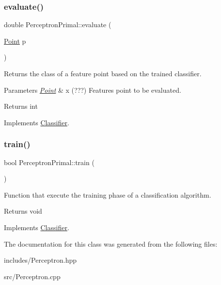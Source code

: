 \subsubsection{\texorpdfstring{evaluate()}{evaluate()}}
{\footnotesize\ttfamily double Perceptron\+Primal\+::evaluate (\begin{DoxyParamCaption}\item[{\hyperlink{class_point}{Point}}]{p }\end{DoxyParamCaption})\hspace{0.3cm}{\ttfamily [virtual]}}



Returns the class of a feature point based on the trained classifier. 


\begin{DoxyParams}{Parameters}
{\em \hyperlink{class_point}{Point}} & x (???) Features point to be evaluated. \\
\hline
\end{DoxyParams}
\begin{DoxyReturn}{Returns}
int 
\end{DoxyReturn}


Implements \hyperlink{class_classifier_ae8e9554823b85ddc2dcad2955da811d9}{Classifier}.

\mbox{\label{class_perceptron_primal_a17f817a72fc7d61d1686ea77f7f9e84d}} 
\subsubsection{\texorpdfstring{train()}{train()}}
{\footnotesize\ttfamily bool Perceptron\+Primal\+::train (\begin{DoxyParamCaption}{ }\end{DoxyParamCaption})\hspace{0.3cm}{\ttfamily [virtual]}}



Function that execute the training phase of a classification algorithm. 

\begin{DoxyReturn}{Returns}
void 
\end{DoxyReturn}


Implements \hyperlink{class_classifier_a2306a5de27555ab093593ac9642bc7d9}{Classifier}.



The documentation for this class was generated from the following files\+:\begin{DoxyCompactItemize}
\item 
includes/Perceptron.\+hpp\item 
src/Perceptron.\+cpp\end{DoxyCompactItemize}
